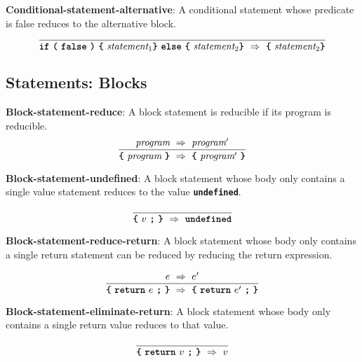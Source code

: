 \textbf{Conditional-statement-alternative}: A conditional statement
whose predicate is false reduces to the alternative block.
\[
\frac{
}{  
  \textbf{\texttt{if}}\ 
  \textbf{\texttt{(}}\ 
  \textbf{\texttt{false}} \ 
  \textbf{\texttt{)}} \ 
  \textbf{\texttt{\{}} \
  \textit{statement}_1
  \textbf{\texttt{\}}} \ 
  \textbf{\texttt{else}} \ 
  \textbf{\texttt{\{}} \
\textit{statement}_2  
  \textbf{\texttt{\}}}
\ \Rightarrow \ 
  \textbf{\texttt{\{}} \
  \textit{statement}_2 
  \textbf{\texttt{\}}}
}
\]

\subsection*{Statements: Blocks}

\textbf{Block-statement-reduce}: A block statement is
reducible if its program is reducible.
\[
\frac{
  \textit{program} 
\ \Rightarrow \ 
  \textit{program}'
}{  
  \textbf{\texttt{\{}} \
  \textit{program} \ 
  \textbf{\texttt{\}}}
\  \Rightarrow \ 
  \textbf{\texttt{\{}} \
  \textit{program}' \ 
  \textbf{\texttt{\}}}
}
\]

\vspace{10mm}

\textbf{Block-statement-undefined}: A block statement 
whose body only contains a single value statement reduces to
the value 
\textbf{\texttt{undefined}}.

\[
\frac{
}{  
  \textbf{\texttt{\{}} \
  v \ 
  \textbf{\texttt{;}} \ 
  \textbf{\texttt{\}}}
\  \Rightarrow \ 
  \textbf{\texttt{undefined}}
}
\]

\vspace{10mm}

\textbf{Block-statement-reduce-return}: A block statement 
whose body only contains a single return statement can 
be reduced by reducing the return expression.

\[
\frac{
  e
\ \Rightarrow \ 
  e'
}{  
  \textbf{\texttt{\{}} \
  \textbf{\texttt{return}} \ e \ 
  \textbf{\texttt{;}} \ 
  \textbf{\texttt{\}}}
\  \Rightarrow \ 
  \textbf{\texttt{\{}} \
  \textbf{\texttt{return}} \ e' \ 
  \textbf{\texttt{;}} \ 
  \textbf{\texttt{\}}}
}
\]

\vspace{10mm}

\textbf{Block-statement-eliminate-return}: A block statement 
whose body only contains a single return value reduces to
that value.

\[
\frac{
}{  
  \textbf{\texttt{\{}} \
  \textbf{\texttt{return}} \ v \ 
  \textbf{\texttt{;}} \ 
  \textbf{\texttt{\}}}
\  \Rightarrow \ 
  v
}
\]


